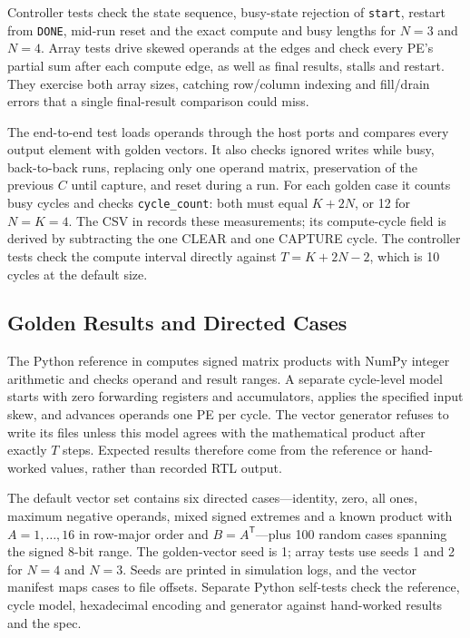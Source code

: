 Controller tests check the state sequence, busy-state rejection of
\texttt{start}, restart from \texttt{DONE}, mid-run reset and the exact
compute and busy lengths for $N=3$ and $N=4$. Array tests drive skewed
operands at the edges and check every PE's partial sum after each compute
edge, as well as final results, stalls and restart. They exercise both
array sizes, catching row/column indexing and fill/drain errors that a
single final-result comparison could miss.

The end-to-end test loads operands through the host ports and compares
every output element with golden vectors. It also checks ignored writes
while busy, back-to-back runs, replacing only one operand matrix,
preservation of the previous $C$ until capture, and reset during a run.
For each golden case it counts busy cycles and checks
\texttt{cycle\_count}: both must equal $K+2N$, or 12 for $N=K=4$.
The CSV in  records these measurements;
its compute-cycle field is derived by subtracting the one CLEAR and one
CAPTURE cycle. The controller tests check the compute interval directly
against $T=K+2N-2$, which is 10 cycles at the default size.

\subsection{Golden Results and Directed Cases}
The Python reference in  computes signed
matrix products with NumPy integer arithmetic and checks operand and
result ranges. A separate cycle-level model starts with zero forwarding
registers and accumulators, applies the specified input skew, and advances
operands one PE per cycle. The vector generator refuses to write its
files unless this model agrees with the mathematical product after
exactly $T$ steps. Expected results therefore come from the reference or
hand-worked values, rather than recorded RTL output.

The default vector set contains six directed cases---identity, zero,
all ones, maximum negative operands, mixed signed extremes and a known
product with $A=1,\ldots,16$ in row-major order and $B=A^{\mathsf T}$---plus
100 random cases spanning the signed 8-bit range. The golden-vector seed
is 1; array tests use seeds 1 and 2 for $N=4$ and $N=3$. Seeds are printed
in simulation logs, and the vector manifest maps cases to file offsets.
Separate Python self-tests check the reference, cycle model, hexadecimal
encoding and generator against hand-worked results and the spec.

